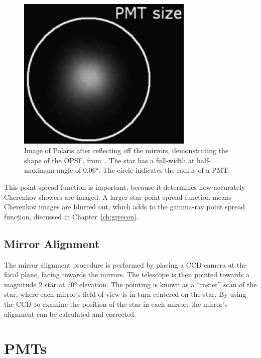 \begin{figure}[ht]
  \centering
  \includegraphics[width=0.75\textwidth]{images/mirror_polaris.eps}
  \caption[Polaris PSF]{
    Image of Polaris after reflecting off the mirrors, demonstrating the shape of the OPSF, from~\cite{Veritas_Detector}.
    The star has a full-width at half-maximum angle of \ang{0.06}.
    The circle indicates the radius of a PMT.}
  \label{fig:mirrorpolaris}
\end{figure}

This point spread function is important, because it determines how accurately Cherenkov showers are imaged.
A larger star point spread function means Cherenkov images are blurred out, which adds to the gamma-ray point spread function, discussed in Chapter~\ref{ch:grrecon}.


\subsection{Mirror Alignment}
The mirror alignment procedure is performed by placing a CCD camera at the focal plane, facing towards the mirrors.
The telescope is then pointed towards a magnitude 2 star at \nicetilde{}\ang{70} elevation.
The pointing is known as a ``raster'' scan of the star, where each mirror's field of view is in turn centered on the star.
By using the CCD to examine the position of the star in each mirror, the mirror's alignment can be calculated and corrected.



\section{PMTs}\label{sec:pmts}


